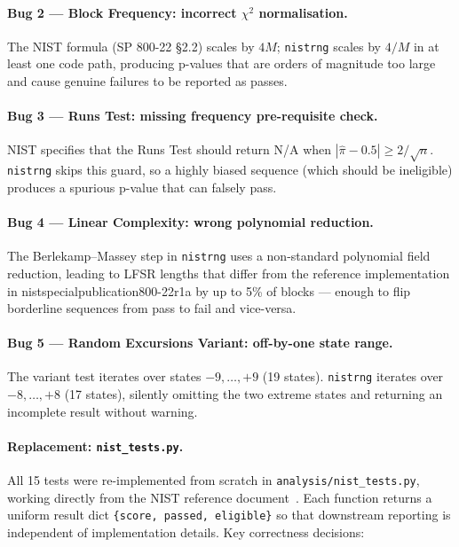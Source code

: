 \documentclass[10pt,twocolumn]{article}
\begin{document}
\paragraph{Bug 2 --- Block Frequency: incorrect $\chi^2$ normalisation.}
The NIST formula (SP 800-22 \S2.2) scales by $4M$; \texttt{nistrng}
scales by $4/M$ in at least one code path, producing p-values that are
orders of magnitude too large and cause genuine failures to be reported
as passes.

\paragraph{Bug 3 --- Runs Test: missing frequency pre-requisite check.}
NIST specifies that the Runs Test should return N/A when
$|\hat\pi - 0.5| \geq 2/\sqrt{n}$.
\texttt{nistrng} skips this guard, so a highly biased sequence (which
should be ineligible) produces a spurious p-value that can falsely pass.

\paragraph{Bug 4 --- Linear Complexity: wrong polynomial reduction.}
The Berlekamp--Massey step in \texttt{nistrng} uses a non-standard
polynomial field reduction, leading to LFSR lengths that differ from
the reference implementation in nistspecialpublication800-22r1a by up
to 5\% of blocks — enough to flip borderline sequences from pass to fail
and vice-versa.

\paragraph{Bug 5 --- Random Excursions Variant: off-by-one state range.}
The variant test iterates over states $-9, \ldots, +9$ (19 states).
\texttt{nistrng} iterates over $-8, \ldots, +8$ (17 states), silently
omitting the two extreme states and returning an incomplete result
without warning.

\paragraph{Replacement: \texttt{nist\_tests.py}.}
All 15 tests were re-implemented from scratch in
\texttt{analysis/nist\_tests.py}, working directly from the NIST
reference document~\cite{nist80022}.
Each function returns a uniform result dict
\texttt{\{score, passed, eligible\}} so that downstream reporting is
independent of implementation details.
Key correctness decisions:
\end{document}
